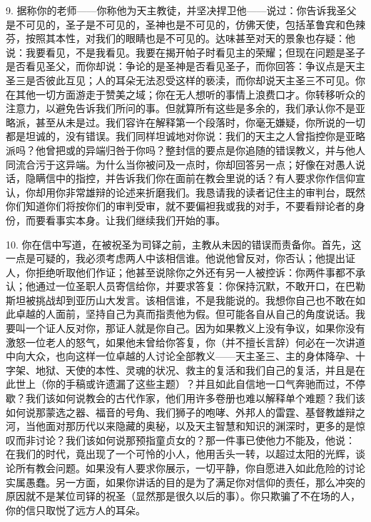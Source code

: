 9. 据称你的老师——你称他为天主教徒，并坚决捍卫他——说过：你告诉我圣父是不可见的，圣子是不可见的，圣神也是不可见的，仿佛天使，包括革鲁宾和色辣芬，按照其本性，对我们的眼睛也是不可见的。达味甚至对天的景象也存疑：他说：我要看见，不是我看见。我要在揭开帕子时看见主的荣耀；但现在问题是圣子是否看见圣父，而你却说：争论的是圣神是否看见圣子，而你回答：争议点是天主圣三是否彼此互见；人的耳朵无法忍受这样的亵渎，而你却说天主圣三不可见。你在其他一切方面游走于赞美之域；你在无人想听的事情上浪费口才。你转移听众的注意力，以避免告诉我们所问的事。但就算所有这些是多余的，我们承认你不是亚略派，甚至从未是过。我们容许在解释第一个段落时，你毫无嫌疑，你所说的一切都是坦诚的，没有错误。我们同样坦诚地对你说：我们的天主之人曾指控你是亚略派吗？他曾把或的异端归咎于你吗？整封信的要点是你追随的错误教义，并与他人同流合污于这异端。为什么当你被问及一点时，你却回答另一点；好像在对愚人说话，隐瞒信中的指控，并告诉我们你在面前在教会里说的话？有人要求你作信仰宣认，你却用你非常雄辩的论述来折磨我们。我恳请我的读者记住主的审判台，既然你们知道你们将按你们的审判受审，就不要偏袒我或我的对手，不要看辩论者的身份，而要看事实本身。让我们继续我们开始的事。\par

10. 你在信中写道，在被祝圣为司铎之前，主教从未因的错误而责备你。首先，这一点是可疑的，我必须考虑两人中该相信谁。他说他曾反对，你否认；他提出证人，你拒绝听取他们作证；他甚至说除你之外还有另一人被控诉：你两件事都不承认；他通过一位圣职人员寄信给你，并要求答复：你保持沉默，不敢开口，在巴勒斯坦被挑战却到亚历山大发言。该相信谁，不是我能说的。我想你自己也不敢在如此卓越的人面前，坚持自己为真而指责他为假。但可能各自从自己的角度说话。我要叫一个证人反对你，那证人就是你自己。因为如果教义上没有争议，如果你没有激怒一位老人的怒气，如果他未曾给你答复，你（并不擅长言辞）何必在一次讲道中向大众，也向这样一位卓越的人讨论全部教义——天主圣三、主的身体降孕、十字架、地狱、天使的本性、灵魂的状况、救主的复活和我们自己的复活，并且是在此世上（你的手稿或许遗漏了这些主题）？并且如此自信地一口气奔驰而过，不停歇？我们该如何说教会的古代作家，他们用许多卷册也难以解释单个难题？我们该如何说那蒙选之器、福音的号角、我们狮子的咆哮、外邦人的雷霆、基督教雄辩之河，当他面对那历代以来隐藏的奥秘，以及天主智慧和知识的渊深时，更多的是惊叹而非讨论？我们该如何说那预指童贞女的？那一件事已使他力不能及，他说： 在我们的时代，竟出现了一个可怜的小人，他用舌头一转，以超过太阳的光辉，谈论所有教会问题。如果没有人要求你展示，一切平静，你自愿进入如此危险的讨论实属愚蠢。另一方面，如果你讲话的目的是为了满足你对信仰的责任，那么冲突的原因就不是某位司铎的祝圣（显然那是很久以后的事）。你只欺骗了不在场的人，你的信只取悦了远方人的耳朵。\par

